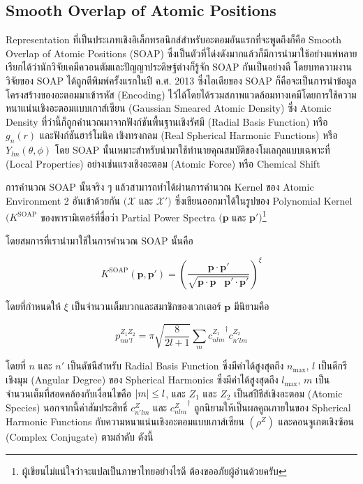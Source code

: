 \subsection{Smooth Overlap of Atomic Positions}
\label{ssec:soap}

Representation ที่เป็นประเภทเชิงอิเล็กทรอนิกส์สำหรับอะตอมอันแรกที่จะพูดถึงก็คือ Smooth Overlap of Atomic Positions (SOAP)
ซึ่งเป็นตัวที่โด่งดังมากแล้วก็มีการนำมาใช้อย่างแพ่หลาย เรียกได้ว่านักวิจัยเคมีควอนตัมและปัญญาประดิษฐ์ต่างก็รู้จัก SOAP กันเป็นอย่างดี
โดยบทความงานวิจัยของ SOAP ได้ถูกตีพิมพ์ครั้งแรกในปี ค.ศ. 2013 ซึ่งไอเดียของ SOAP ก็คือจะเป็นการนำข้อมูลโครงสร้างของอะตอมมาเข้ารหัส
(Encoding) ไว้ได้โดยได้รวมสภาพแวดล้อมทางเคมีโดยการใช้ความหนาแน่นเชิงอะตอมแบบเกาส์เซียน (Gaussian Smeared Atomic Density)
ซึ่ง Atomic Density ที่ว่านี้ก็ถูกคำนวณมาจากฟังก์ชันพื้นฐานเชิงรัศมี (Radial Basis Function) หรือ $g_{n}(r)$ และฟังก์ชันฮาร์โมนิค%
เชิงทรงกลม (Real Spherical Harmonic Functions) หรือ $Y_{lm}(\theta, \phi)$\autocite{bartok2013,de2016}
โดย SOAP นั้นเหมาะสำหรับนำมาใช้ทำนายคุณสมบัติของโมเลกุลแบบเฉพาะที่ (Local Properties) อย่างเช่นแรงเชิงอะตอม (Atomic Force)
หรือ Chemical Shift

การคำนวณ SOAP นั้นจริง ๆ แล้วสามารถทำได้ผ่านการคำนวณ Kernel ของ Atomic Environment 2 อันเข้าด้วยกัน $(\mathcal{X}$ และ
$\mathcal{X}')$ ซึ่งเขียนออกมาได้ในรูปของ Polynomial Kernel $(K^\text{SOAP}$ ของพารามิเตอร์ที่ชื่อว่า Partial Power
Spectra $(\bm{p}$ และ $\bm{p}')$\footnote{ผู้เขียนไม่แน่ใจว่าจะแปลเป็นภาษาไทยอย่างไรดี ต้องขออภัยผู้อ่านด้วยครับ}

โดยสมการที่เรานำมาใช้ในการคำนวณ SOAP นั้นคือ

\begin{equation}\label{eq:soap}
    K^\text{SOAP}(\bm{p}, \bm{p'}) = \left( \frac{\bm{p} \cdot \bm{p'}}{\sqrt{
            \bm{p} \cdot \bm{p} \;\;\; \bm{p'} \cdot \bm{p'}}}\right)^{\xi}
\end{equation}

\noindent โดยที่กำหนดให้ $\xi$ เป็นจำนวนเต็มบวกและสมาชิกของเวกเตอร์ $\bm{p}$ มีนิยามคือ

\begin{equation}\label{eq:soap_power_spec}
    p^{Z_1 Z_2}_{n n' l} = \pi \sqrt{\frac{8}{2l+1}}\sum_m {c^{Z_1}_{n l m}}^{\dagger} c^{Z_2}_{n' l m}
\end{equation}

\noindent โดยที่ $n$ และ $n'$ เป็นดัชนีสำหรับ Radial Basis Function ซึ่งมีค่าได้สูงสุดถึง $n_{\max}$, $l$ เป็นดีกรีเชิงมุม
(Angular Degree) ของ Spherical Harmonics ซึ่งมีค่าได้สูงสุดถึง $l_{\max}$, $m$ เป็นจำนวนเต็มที่สอดคล้องกับเงื่อนไขคือ $\abs{m}
    \leq l$, และ $Z_{1}$ และ $Z_{2}$ เป็นสปีชีส์เชิงอะตอม (Atomic Species) นอกจากนี้ค่าสัมประสิทธิ์ $c^{Z}_{n'lm}$ และ
${c^{Z}_{nlm}}^{\dagger}$ ถูกนิยามให้เป็นผลคูณภายในของ Spherical Harmonic Functions กับความหนาแน่นเชิงอะตอมแบบเกาส์เซียน
$(\rho^Z)$ และคอนจูเกตเชิงซ้อน (Complex Conjugate) ตามลำดับ\autocite{de2016} ดังนี้

